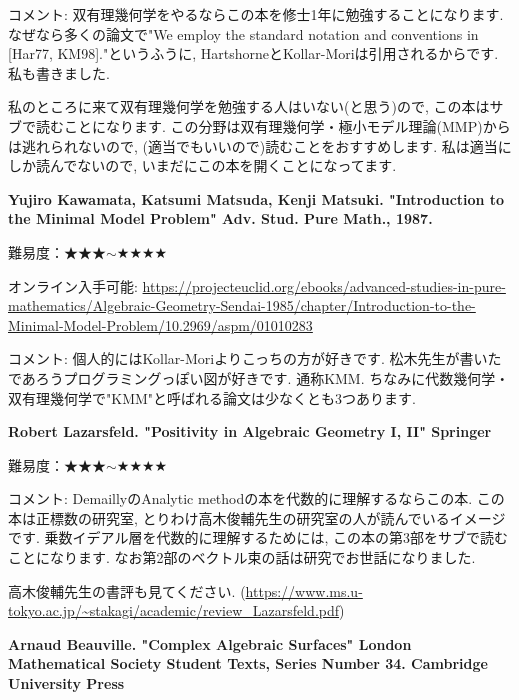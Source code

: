 コメント: 双有理幾何学をやるならこの本を修士1年に勉強することになります. なぜなら多くの論文で"We employ the standard notation and conventions in [Har77, KM98]."というふうに, HartshorneとKollar-Moriは引用されるからです. 私も書きました. 

私のところに来て双有理幾何学を勉強する人はいない(と思う)ので, この本はサブで読むことになります. 
 この分野は双有理幾何学・極小モデル理論(MMP)からは逃れられないので, (適当でもいいので)読むことをおすすめします. 私は適当にしか読んでないので, いまだにこの本を開くことになってます. 
 \vspace{8pt}
 
 \textbf{Yujiro Kawamata, Katsumi Matsuda, Kenji Matsuki. "Introduction to the Minimal Model Problem" Adv. Stud. Pure Math., 1987. } \vspace{-6pt}

難易度：★★★$\sim$★★★★\vspace{-6pt} 

オンライン入手可能: 
\url{https://projecteuclid.org/ebooks/advanced-studies-in-pure-mathematics/Algebraic-Geometry-Sendai-1985/chapter/Introduction-to-the-Minimal-Model-Problem/10.2969/aspm/01010283} 
\vspace{-6pt}

コメント: 個人的にはKollar-Moriよりこっちの方が好きです. 松木先生が書いたであろうプログラミングっぽい図が好きです. 通称KMM. ちなみに代数幾何学・双有理幾何学で"KMM"と呼ばれる論文は少なくとも3つあります. 
\vspace{8pt}

\textbf{Robert Lazarsfeld. "Positivity in Algebraic Geometry I, II" Springer} \vspace{-6pt}

難易度：★★★$\sim$★★★★\vspace{-6pt} 

コメント: DemaillyのAnalytic methodの本を代数的に理解するならこの本. この本は正標数の研究室, とりわけ高木俊輔先生の研究室の人が読んでいるイメージです. 乗数イデアル層を代数的に理解するためには, この本の第3部をサブで読むことになります. なお第2部のベクトル束の話は研究でお世話になりました. 

高木俊輔先生の書評も見てください. (\url{https://www.ms.u-tokyo.ac.jp/~stakagi/academic/review_Lazarsfeld.pdf})
\vspace{8pt}


\textbf{Arnaud Beauville. "Complex Algebraic Surfaces" London Mathematical Society Student Texts, Series Number 34. Cambridge University Press} \vspace{-6pt}

